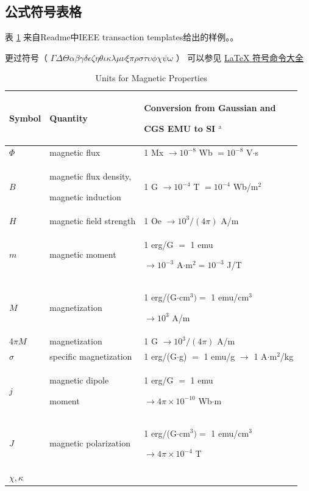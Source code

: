 \documentclass[UTF8,12pt]{article} %
\begin{document}
\subsection{公式符号表格}
表 \ref{tab:2} 来自Readme中IEEE transaction templates给出的样例。。

更过符号（ \textbf{$ \Gamma \Delta \Theta \alpha \beta \gamma \delta \epsilon \zeta\eta \theta \iota \kappa \lambda \mu \nu \xi \pi \rho \sigma \tau \upsilon \phi \chi \psi \omega$ }）
可以参见 \href{https://www.cnblogs.com/Coolxxx/p/5982439.html}{LaTeX 符号命令大全}

\begin{table}
  \centering 
  \caption{Units for Magnetic Properties}
  \label{tab:2}
  \setlength{\tabcolsep}{3pt}
  \begin{tabular}{|p{50pt}|p{150pt}|p{250pt}|}
  \hline
  Symbol& 
  Quantity& 
  Conversion from Gaussian and \par CGS EMU to SI $^{\mathrm{a}}$ \\
  \hline
  $\Phi $& 
  magnetic flux& 
  1 Mx $\to  10^{-8}$ Wb $= 10^{-8}$ V$\cdot $s \\
  $B$& 
  magnetic flux density, \par magnetic induction& 
  1 G $\to  10^{-4}$ T $= 10^{-4}$ Wb/m$^{2}$ \\
  $H$& 
  magnetic field strength& 
  1 Oe $\to  10^{3}/(4\pi )$ A/m \\
  $m$& 
  magnetic moment& 
  1 erg/G $=$ 1 emu \par $\to 10^{-3}$ A$\cdot $m$^{2} = 10^{-3}$ J/T \\
  $M$& 
  magnetization& 
  1 erg/(G$\cdot $cm$^{3}) =$ 1 emu/cm$^{3}$ \par $\to 10^{3}$ A/m \\
  4$\pi M$& 
  magnetization& 
  1 G $\to  10^{3}/(4\pi )$ A/m \\
  $\sigma $& 
  specific magnetization& 
  1 erg/(G$\cdot $g) $=$ 1 emu/g $\to $ 1 A$\cdot $m$^{2}$/kg \\
  $j$& 
  magnetic dipole \par moment& 
  1 erg/G $=$ 1 emu \par $\to 4\pi \times  10^{-10}$ Wb$\cdot $m \\
  $J$& 
  magnetic polarization& 
  1 erg/(G$\cdot $cm$^{3}) =$ 1 emu/cm$^{3}$ \par $\to 4\pi \times  10^{-4}$ T \\
  $\chi , \kappa $& 

\end{tabular}
\end{table}
\end{document}
